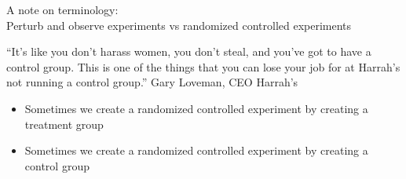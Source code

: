 \documentclass[aspectratio=169]{beamer}
\begin{document}
\begin{frame}

A note on terminology:\\
Perturb and observe experiments vs randomized controlled experiments

\end{frame}
\begin{frame}

``It's like you don't harass women, you don't steal, and you've got to have a control group. This is one of the things that you can lose your job for at Harrah's not running a control group.''
Gary Loveman, CEO Harrah's

\pause
\begin{itemize}
\item Sometimes we create a randomized controlled experiment by creating a treatment group 
\item Sometimes we create a randomized controlled experiment by creating a control group
\end{itemize}

\end{frame}
\end{document}
